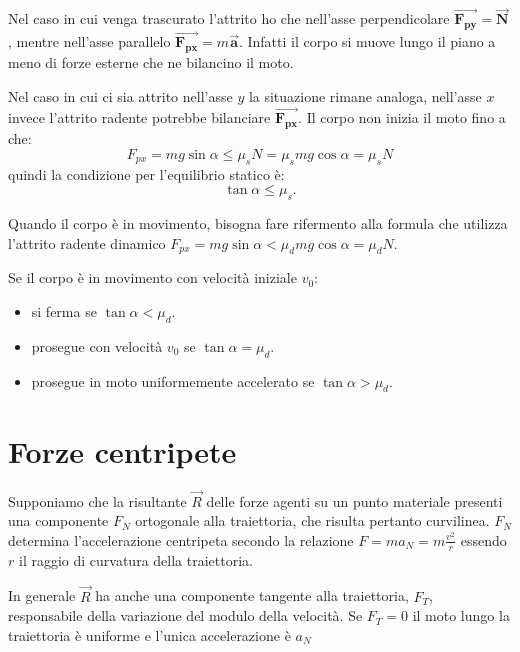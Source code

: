 \documentclass[class=book, crop=false, oneside, 12pt]{standalone}
\begin{document}
Nel caso in cui venga trascurato l'attrito ho che nell'asse perpendicolare \(\overrightarrow{\mathbf{F_{py}}} = \overrightarrow{\mathbf{N}}\), 
mentre nell'asse parallelo \(\overrightarrow{\mathbf{F_{px}}} = m \overrightarrow{\mathbf{a}}\). 
Infatti il corpo si muove lungo il piano a meno di forze esterne che ne bilancino il moto.

Nel caso in cui ci sia attrito nell'asse \(y\) la situazione rimane analoga, nell'asse \(x\) invece l'attrito radente potrebbe bilanciare \(\overrightarrow{\mathbf{F_{px}}}\).
Il corpo non inizia il moto fino a che:
\begin{equation*}
    F_{px} = m g \sin \alpha \leq \mu_s N = \mu_s m g \cos \alpha = \mu_s N
\end{equation*}
quindi la condizione per l'equilibrio statico è:
\begin{equation}
    \tan \alpha \leq \mu_s.
\end{equation}

Quando il corpo è in movimento, bisogna fare rifermento alla formula che utilizza l'attrito radente dinamico \(F_{px} = m g \sin \alpha < \mu_d m g \cos \alpha = \mu_d N\).

Se il corpo è in movimento con velocità iniziale \(v_0\):
\begin{itemize}
    \item si ferma se \(\tan \alpha < \mu_d\).
    \item prosegue con velocità \(v_0\) se \(\tan \alpha  = \mu_d\).
    \item prosegue in moto uniformemente accelerato se \(\tan \alpha > \mu_d\).
\end{itemize}

\section{Forze centripete}

Supponiamo che la risultante \(\overrightarrow{R}\) delle forze agenti su un punto materiale presenti una componente \(F_N\) ortogonale alla traiettoria, che risulta pertanto curvilinea. \(F_N\) determina l'accelerazione centripeta secondo la relazione \(F = m a_N = m \frac {v^2} {r} \) essendo \(r\) il raggio di curvatura della traiettoria.

In generale \(\overrightarrow{R}\) ha anche una componente tangente alla traiettoria, \(F_T\), responsabile della variazione del modulo della velocità. Se \(F_T = 0\) il moto lungo la traiettoria è uniforme e l'unica accelerazione è \(a_N\)
\end{document}
